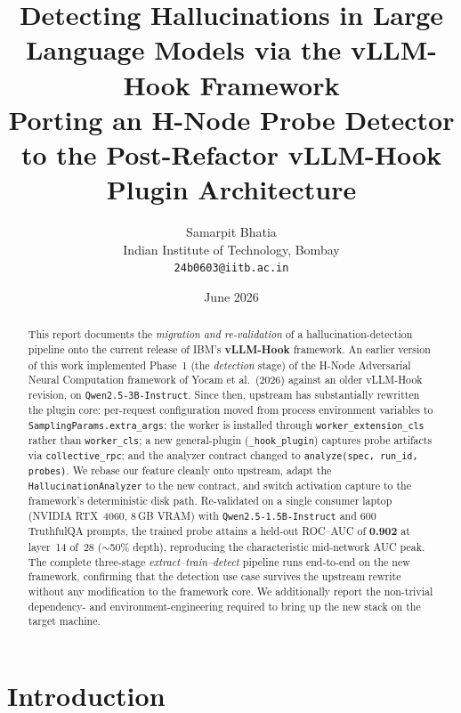 \documentclass[11pt]{article}
\title{\vspace{-1.5em}\textbf{Detecting Hallucinations in Large Language Models via the
vLLM-Hook Framework}\\[0.4em]
\large Porting an H-Node Probe Detector to the Post-Refactor vLLM-Hook Plugin Architecture}
\author{Samarpit Bhatia\\
Indian Institute of Technology, Bombay\\
\texttt{24b0603@iitb.ac.in}}
\date{June 2026}
\begin{document}
\maketitle

\begin{abstract}
This report documents the \emph{migration and re-validation} of a hallucination-detection
pipeline onto the current release of IBM's \textbf{vLLM-Hook} framework. An earlier version
of this work implemented Phase~1 (the \emph{detection} stage) of the H-Node Adversarial
Neural Computation framework of Yocam et al.\ (2026) against an older vLLM-Hook revision,
on \texttt{Qwen2.5-3B-Instruct}. Since then, upstream has substantially rewritten the plugin
core: per-request configuration moved from process environment variables to
\texttt{SamplingParams.extra\_args}; the worker is installed through
\texttt{worker\_extension\_cls} rather than \texttt{worker\_cls}; a new general-plugin
(\texttt{\_hook\_plugin}) captures probe artifacts via \texttt{collective\_rpc}; and the
analyzer contract changed to \texttt{analyze(spec, run\_id, probes)}. We rebase our feature
cleanly onto upstream, adapt the \texttt{HallucinationAnalyzer} to the new contract, and
switch activation capture to the framework's deterministic disk path. Re-validated on a
single consumer laptop (NVIDIA RTX~4060, 8\,GB VRAM) with \texttt{Qwen2.5-1.5B-Instruct} and
600 TruthfulQA prompts, the trained probe attains a held-out ROC--AUC of \textbf{0.902} at
layer~14 of~28 ($\sim$50\% depth), reproducing the characteristic mid-network AUC peak. The
complete three-stage \emph{extract--train--detect} pipeline runs end-to-end on the new
framework, confirming that the detection use case survives the upstream rewrite without any
modification to the framework core. We additionally report the non-trivial dependency- and
environment-engineering required to bring up the new stack on the target machine.
\end{abstract}

\tableofcontents
\bigskip

\section{Introduction}
\end{document}
